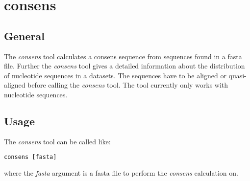 \section{consens} \label{sec-consens}

\subsection{General}

The \emph{consens} tool calculates a consens sequence from sequences found in
a fasta file. Further the \emph{consens} tool gives a detailed information
about the distribution of nucleotide sequences in a datasets.
The sequences have to be aligned or quasi-aligned before calling the
\emph{consens} tool. The tool currently only works with nucleotide
sequences.

\subsection{Usage}

The \emph{consens} tool can be called like:
\begin{lstlisting}
consens [fasta]
\end{lstlisting}
where the \emph{fasta} argument is a fasta file to perform the
\emph{consens} calculation on.

